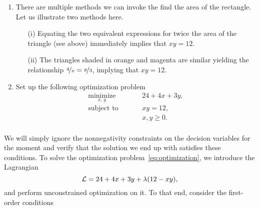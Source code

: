 \begin{minipage}{0.5\textwidth}
\begin{center}
\end{center}
\end{minipage}
%

\begin{enumerate}
    \setlength\itemsep{0em}
    \item There are multiple methods we can invoke the find the area of the
    rectangle. Let us illustrate two methods here.

    \begin{enumerate}
    \item[(i)] Equating the two equivalent expressions for twice the area of
    the triangle (see above) immediately implies that $xy = 12$.
    \item[(ii)] The triangles shaded in orange and magenta are similar yielding
    the relationship $\nicefrac{4}{x} = \nicefrac{y}{3}$, implying that $xy =
    12$.
    \end{enumerate}

    \item Set up the following optimization problem 
    \begin{equation}
    \begin{aligned}
        \underset{x, \, y }{\textrm{minimize}} && &24 + 4x + 3y , \\
        \textrm{subject to} 
        &&\quad &xy = 12, \\
        &&\quad &x,y \geq 0.  \\
    \end{aligned}    
    \label{eq:optimization}
\end{equation}
\end{enumerate}
%
We will simply ignore the nonnegativity constraints on the decision variables
for the moment and verify that the solution we end up with satisfies these
conditions. To solve the optimization problem~\eqref{eq:optimization}, we
introduce the Lagrangian
\[ \mathcal{L} = 24 + 4x + 3y + \lambda(12-xy), \] and perform unconstrained
optimization on it. To that end, consider the first-order conditions
